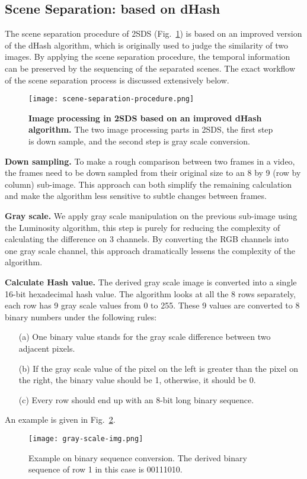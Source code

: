 \documentclass[
twocolumn,
]{ceurart}
\begin{document}
\subsection{Scene Separation: based on dHash}
The scene separation procedure of 2SDS (Fig.~\ref{fig:procedure}) is based on an improved version of the dHash algorithm, which is originally used to judge the similarity of two images. By applying the scene separation procedure, the temporal information can be preserved by the sequencing of the separated scenes. The exact workflow of the scene separation process is discussed extensively below.

\begin{figure}
  \centering
  \texttt{[image: scene-separation-procedure.png]}
  \caption{\textbf{Image processing in 2SDS based on an improved dHash algorithm.} The two image processing parts in 2SDS, the first step is down sample, and the second step is gray scale conversion.}\label{fig:procedure}
\end{figure}

\textbf{Down sampling.} To make a rough comparison between two frames in a video, the frames need to be down sampled from their original size to an 8 by 9 (row by column) sub-image. This approach can both simplify the remaining calculation and make the algorithm less sensitive to subtle changes between frames.

\textbf{Gray scale.} We apply gray scale manipulation on the previous sub-image using the Luminosity algorithm, this step is purely for reducing the complexity of calculating the difference on 3 channels. By converting the RGB channels into one gray scale channel, this approach dramatically lessens the complexity of the algorithm.

\textbf{Calculate Hash value.} The derived gray scale image is converted into a single 16-bit hexadecimal hash value. The algorithm looks at all the 8 rows separately, each row has 9 gray scale values from 0 to 255. These 9 values are converted to 8 binary numbers under the following rules:
\begin{enumerate}
  \item[(a)] One binary value stands for the gray scale difference between two adjacent pixels.
  \item[(b)] If the gray scale value of the pixel on the left is greater than the pixel on the right, the binary value should be 1, otherwise, it should be 0.
  \item[(c)] Every row should end up with an 8-bit long binary sequence.
\end{enumerate}
An example is given in Fig.~\ref{fig:sequence}.
\begin{figure}
  \centering
  \texttt{[image: gray-scale-img.png]}
  \caption{Example on binary sequence conversion. The derived binary sequence of row 1 in this case is 00111010.}\label{fig:sequence}
\end{figure}
\end{document}
